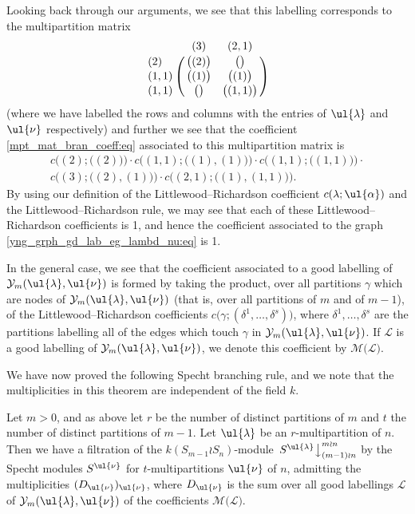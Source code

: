 Looking back through our arguments, we see that this labelling corresponds to the multipartition matrix
\[
\bordermatrix{
      & (3)             &(2,1)              \cr
(2)   & \bigl((2)\bigr) & \bigl(\bigr)      \cr
(1,1) & \bigl((1)\bigr) & \bigl((1)\bigr)   \cr
(1,1) & \bigl(\bigr)    & \bigl((1,1)\bigr)
}
\]
(where we have labelled the rows and columns with the entries of $\ul{\lambda}$ and $\ul{\nu}$ respectively)
and further we see that the coefficient \eqref{mpt_mat_bran_coeff:eq} associated to this multipartition matrix is
\begin{multline*}
c\bigl((2);\bigl((2)\bigr)\bigr)\cdot c\bigl((1,1);\bigl((1),(1)\bigr)\bigr)\cdot c\bigl((1,1);\bigl((1,1)\bigr)\bigr)\cdot\\
c\bigl((3);\bigl((2),(1)\bigr)\bigr)\cdot c\bigl((2,1);\bigl((1),(1,1)\bigr)\bigr).
\end{multline*}
By using our definition of the Littlewood--Richardson coefficient $c(\lambda;\ul{\alpha})$ and the Littlewood--Richardson rule, we may see
that each of these Littlewood--Richardson coefficients is 1, and hence the coefficient
associated to the graph \eqref{yng_grph_gd_lab_eg_lambd_nu:eq} is 1.

In the general case, we see that the coefficient associated to a good labelling of $\mathcal{Y}_m(\ul{\lambda},\ul{\nu})$ is formed by
taking the product, over all partitions $\gamma$ which are nodes of $\mathcal{Y}_m(\ul{\lambda},\ul{\nu})$ (that is, over all partitions
of $m$ and of $m-1$), of the Littlewood--Richardson coefficients $c\bigl(\gamma;(\delta^1,\ldots,\delta^s)\bigr)$, where
$\delta^1,\ldots,\delta^s$ are the partitions
labelling all of the edges which touch $\gamma$ in $\mathcal{Y}_m(\ul{\lambda},\ul{\nu})$. If $\mathcal{L}$ is a good labelling of
$\mathcal{Y}_m(\ul{\lambda},\ul{\nu})$, we denote this coefficient by $\mathcal{M}\bigl(\mathcal{L}\bigr)$.

We have now proved the following Specht branching rule, and we note that the multiplicities in this theorem are independent of the field
$k$.

\begin{theo}\label{wr_branching_one:thm}
Let $m>0$, and as above let $r$ be the number of distinct partitions of $m$ and $t$ the number of distinct partitions of $m-1$.
Let $\ul{\lambda}$ be an $r$-multipartition of $n$. Then we have a filtration of the $k(S_{m-1} \wr S_n)$-module
$\left.S^{\ul{\lambda}}\right\downarrow^{m \wr n}_{(m-1) \wr n}$ by the Specht modules $S^{\ul{\nu}}$ for $t$-multipartitions $\ul{\nu}$ of $n$,
admitting the multiplicities $(D_{\ul{\nu}})_{\ul{\nu}}$,  where $D_{\ul{\nu}}$  is the sum over all good labellings $\mathcal{L}$ of
$\mathcal{Y}_m(\ul{\lambda},\ul{\nu})$ of the coefficients $\mathcal{M}\bigl(\mathcal{L}\bigr)$.
\end{theo}

